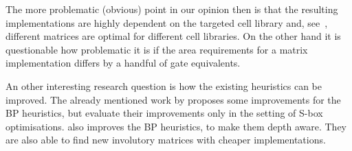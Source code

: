 The more problematic (obvious) point in our opinion then is that the resulting implementations are highly dependent on the targeted cell library and, see~\cite{IWSEC:BanFunIso19}, different matrices are optimal for different cell libraries.
On the other hand it is questionable how problematic it is if the area requirements for a matrix implementation differs by a handful of gate equivalents.

An other interesting research question is how the existing heuristics can be improved.
The already mentioned work by \textcite{TCHES:ReyTahAsh18} proposes some improvements for the BP heuristics, but evaluate their improvements only in the setting of S-box optimisations.
\textcite{ToSC:LSLWH19} also improves the BP heuristics, to make them depth aware.
They are also able to find new involutory matrices with cheaper implementations.


